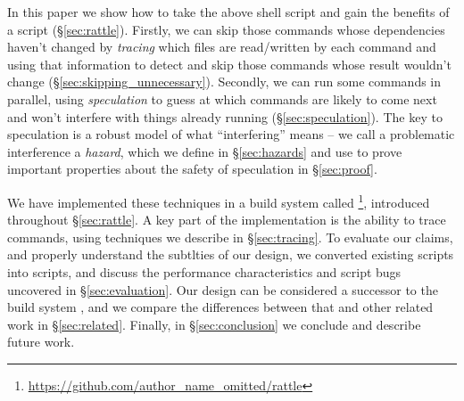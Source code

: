 In this paper we show how to take the above shell script and gain the benefits of a \Make script (\S\ref{sec:rattle}). Firstly, we can skip those commands whose dependencies haven't changed by \emph{tracing} which files are read/written by each command and using that information to detect and skip those commands whose result wouldn't change (\S\ref{sec:skipping_unnecessary}). Secondly, we can run some commands in parallel, using \emph{speculation} to guess at which commands are likely to come next and won't interfere with things already running (\S\ref{sec:speculation}). The key to speculation is a robust model of what ``interfering'' means -- we call a problematic interference a \emph{hazard}, which we define in \S\ref{sec:hazards} and use to prove important properties about the safety of speculation in \S\ref{sec:proof}.

We have implemented these techniques in a build system called \Rattle\footnote{\url{https://github.com/author_name_omitted/rattle}}, introduced throughout \S\ref{sec:rattle}. A key part of the implementation is the ability to trace commands, using techniques we describe in \S\ref{sec:tracing}. To evaluate our claims, and properly understand the subtlties of our design, we converted existing \Make scripts into \Rattle scripts, and discuss the performance characteristics and \Make script bugs uncovered in \S\ref{sec:evaluation}. Our design can be considered a successor to the \Memoize build system \cite{memoize}, and we compare the differences between that and other related work in \S\ref{sec:related}. Finally, in \S\ref{sec:conclusion} we conclude and describe future work.
